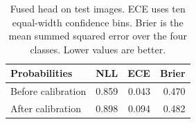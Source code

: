\begin{table}[t]
\centering\small
\begin{tabular}{lrrr}
\toprule
Probabilities & NLL & ECE & Brier \\
\midrule
Before calibration & 0.859 & 0.043 & 0.470 \\
After calibration & 0.898 & 0.094 & 0.482 \\
\bottomrule
\end{tabular}
\caption{Fused head on test images. ECE uses ten equal-width confidence bins. Brier is the mean summed squared error over the four classes. Lower values are better.}
\label{tab:image_cal}
\end{table}
